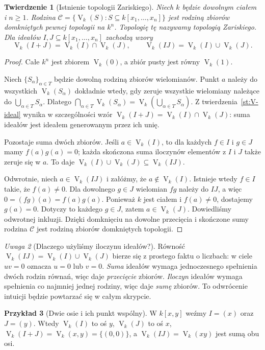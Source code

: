 \documentclass[11pt,a4paper,openany]{report}
\numberwithin{equation}{section}
\theoremstyle{plain}
\newtheorem{twierdzenie}{Twierdzenie}[section]
\theoremstyle{definition}
\newtheorem{przyklad}[twierdzenie]{Przykład}
\theoremstyle{remark}
\newtheorem{uwaga}[twierdzenie]{Uwaga}
\newcommand{\V}{\operatorname V}
\begin{document}
\begin{twierdzenie}[Istnienie topologii Zariskiego]
\label{tw:zariski-top}
Niech $k$ będzie dowolnym ciałem i $n\ge1$.
Rodzina $\mathcal C=\{\V_k(S):S\subseteq k[x_1,\dots,x_n]\}$
jest rodziną zbiorów domkniętych pewnej topologii na $k^n$.
Topologię tę nazywamy \emph{topologią Zariskiego}.
Dla ideałów $I,J\subseteq k[x_1,\dots,x_n]$ zachodzą wzory
\[
\V_k(I+J)=\V_k(I)\cap\V_k(J),\qquad
\V_k(IJ)=\V_k(I)\cup\V_k(J).
\]
\end{twierdzenie}
\begin{proof}
Całe $k^n$ jest zbiorem $\V_k(0)$, a zbiór pusty jest równy
$\V_k(1)$.

Niech $\{S_\alpha\}_{\alpha\in T}$ będzie dowolną rodziną zbiorów
wielomianów. Punkt $a$ należy do wszystkich $\V_k(S_\alpha)$
dokładnie wtedy, gdy zeruje wszystkie wielomiany należące do
$\bigcup_{\alpha\in T}S_\alpha$. Dlatego
$\bigcap_{\alpha\in T}\V_k(S_\alpha)=
\V_k(\bigcup_{\alpha\in T}S_\alpha)$.
Z twierdzenia~\ref{st:V-ideal} wynika w szczególności wzór
$\V_k(I+J)=\V_k(I)\cap\V_k(J)$: suma ideałów jest ideałem
generowanym przez ich unię.

Pozostaje suma dwóch zbiorów. Jeśli $a\in\V_k(I)$, to dla
każdych $f\in I$ i $g\in J$ mamy $f(a)g(a)=0$; każda
skończona suma iloczynów elementów z $I$ i $J$ także zeruje się w $a$.
To daje $\V_k(I)\cup\V_k(J)\subseteq\V_k(IJ)$.

Odwrotnie, niech $a\in\V_k(IJ)$ i załóżmy, że
$a\notin\V_k(I)$. Istnieje wtedy $f\in I$ takie, że
$f(a)\ne0$. Dla dowolnego $g\in J$ wielomian $fg$ należy do
$IJ$, a więc $0=(fg)(a)=f(a)g(a)$. Ponieważ $k$ jest ciałem
i $f(a)\ne0$, dostajemy $g(a)=0$. Dotyczy to każdego $g\in J$,
zatem $a\in\V_k(J)$. Dowiedliśmy odwrotnej inkluzji.
Dzięki domknięciu na dowolne przecięcia i skończone sumy
rodzina $\mathcal C$ jest rodziną zbiorów domkniętych topologii.
\end{proof}

\begin{uwaga}[Dlaczego użyliśmy iloczynu ideałów?]
Równość $\V_k(IJ)=\V_k(I)\cup\V_k(J)$ bierze się z prostego
faktu o liczbach: w ciele $uv=0$ oznacza $u=0$ lub $v=0$.
\emph{Suma} ideałów wymaga jednoczesnego spełnienia dwóch rodzin
równań, więc daje \emph{przecięcie} zbiorów. \emph{Iloczyn} ideałów
wymaga spełnienia co najmniej jednej rodziny, więc daje \emph{sumę}
zbiorów. To odwrócenie intuicji będzie powtarzać się w całym skrypcie.
\end{uwaga}

\begin{przyklad}[Dwie osie i ich punkt wspólny]
W $k[x,y]$ weźmy $I=(x)$ oraz $J=(y)$.
Wtedy $\V_k(I)$ to oś $y$, $\V_k(J)$ to oś $x$,
$\V_k(I+J)=\V_k(x,y)=\{(0,0)\}$, a
$\V_k(IJ)=\V_k(xy)$ jest sumą obu osi.
\end{przyklad}
\end{document}
